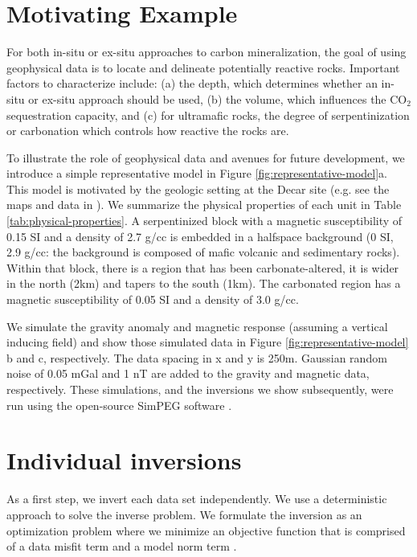\documentclass[
    paper,
  ]{geophysics}
\begin{document}
\section{Motivating Example}
For both in-situ or ex-situ approaches to carbon mineralization, the goal of using geophysical data is to locate and delineate potentially reactive rocks. Important factors to characterize include: (a) the depth, which determines whether an in-situ or ex-situ approach should be used, (b) the volume, which influences the CO$_2$ sequestration capacity, and (c) for ultramafic rocks, the degree of serpentinization or carbonation which controls how reactive the rocks are.

To illustrate the role of geophysical data and avenues for future development, we introduce a simple representative model in Figure \ref{fig:representative-model}a. This model is motivated by the geologic setting at the Decar site (e.g. see the maps and data in \cite{Mitchinson2020}). We summarize the physical properties of each unit in Table \ref{tab:physical-properties}. A serpentinized block with a magnetic susceptibility of 0.15 SI and a density of 2.7 g/cc is embedded in a halfspace background (0 SI, 2.9 g/cc: the background is composed of mafic volcanic and sedimentary rocks). Within that block, there is a region that has been carbonate-altered, it is wider in the north (2km) and tapers to the south (1km). The carbonated region has a magnetic susceptibility of 0.05 SI and a density of 3.0 g/cc.







We simulate the gravity anomaly and magnetic response (assuming a vertical inducing field) and show those simulated data in Figure \ref{fig:representative-model} b and c, respectively. The data spacing in x and y is 250m. Gaussian random noise of 0.05 mGal and 1 nT are added to the gravity and magnetic data, respectively. These simulations, and the inversions we show subsequently, were run using the open-source SimPEG software \citep{Cockett2015}.





\section{Individual inversions}
As a first step, we invert each data set independently. We use a deterministic approach to solve the inverse problem. We formulate the inversion as an optimization problem where we minimize an objective function that is comprised of a data misfit term and a model norm term \citep{Tikhonov1977}.
\end{document}
